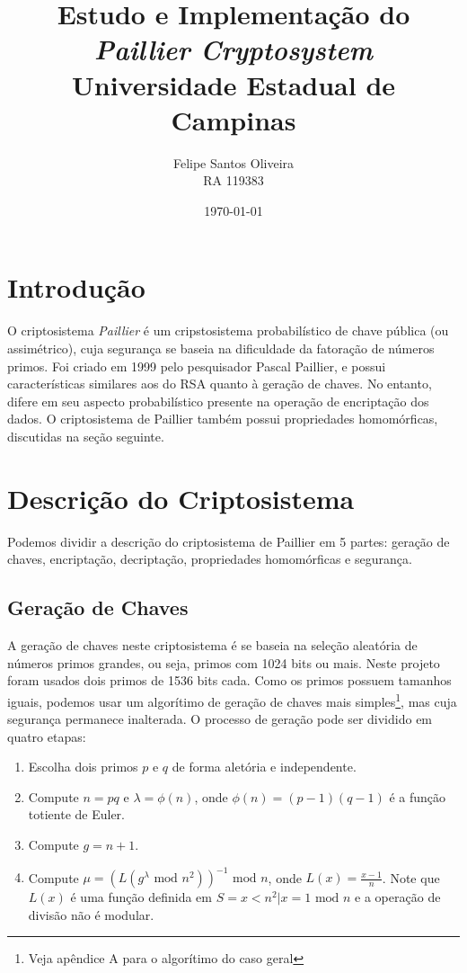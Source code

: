 \documentclass[10pt]{article}
\title{\textbf{Estudo e Implementação do \textit{Paillier Cryptosystem}}\\
               {\large Universidade Estadual de Campinas}}
\author{Felipe Santos Oliveira\\
        RA 119383}
\date{\today}
\begin{document}
    \maketitle

    \section{Introdução}
    O criptosistema \textit{Paillier} é um cripstosistema probabilístico de chave pública (ou assimétrico), cuja segurança se baseia na dificuldade da fatoração de números primos. Foi criado em 1999 pelo pesquisador Pascal Paillier, e possui características similares aos do RSA quanto à geração de chaves. No entanto, difere em seu aspecto probabilístico presente na operação de encriptação dos dados. O criptosistema de Paillier também possui propriedades homomórficas, discutidas na seção seguinte.

    \section{Descrição do Criptosistema}
    Podemos dividir a descrição do criptosistema de Paillier em 5 partes: geração de chaves, encriptação, decriptação, propriedades homomórficas e segurança.

        \subsection{Geração de Chaves}
            A geração de chaves neste criptosistema é se baseia na seleção aleatória de números primos grandes, ou seja, primos com 1024 bits ou mais. Neste projeto foram usados dois primos de 1536 bits cada. Como os primos possuem tamanhos iguais, podemos usar um algorítimo de geração de chaves mais simples\footnote{Veja apêndice A para o algorítimo do caso geral}, mas cuja segurança permanece inalterada. O processo de geração pode ser dividido em quatro etapas:

            \begin{enumerate}
                \item Escolha dois primos $p$ e $q$ de forma aletória e independente.
                \item Compute $n = pq$ e $\lambda = \phi(n)$, onde $\phi(n) = (p-1)(q-1)$ é a função totiente de Euler.
                \item Compute $g = n + 1$.
                \item Compute $\mu = (L(g^{\lambda}\text{ mod } n^2))^{-1} \text{ mod } n$, onde $L(x) = \frac{x - 1}{n}$. Note que $L(x)$ é uma função definida em $S = {x < n^2 | x = 1 \text{ mod } n}$ e a operação de divisão não é modular.
            \end{enumerate}
\end{document}

